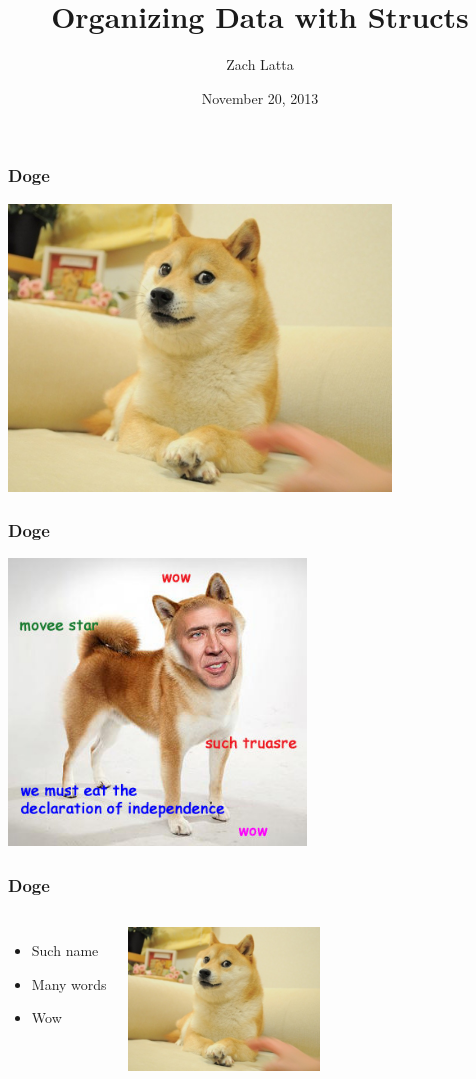 \documentclass{beamer}
\begin{document}
\title[Structs]{Organizing Data with Structs}
\author[Z. Latta]{Zach Latta}
\date[November 2013]{November 20, 2013}

\frame{\titlepage}

\begin{frame}
  \frametitle{Doge}
  \includegraphics[height=3.0in]{doge}
\end{frame}

\begin{frame}
  \frametitle{Doge}
  \includegraphics[height=3.0in]{doge_cage}
\end{frame}

\begin{frame}
  \frametitle{Doge}
  \begin{columns}[c]
    \column{1.5in}
    \begin{itemize}
      \item Such name
      \item Many words
      \item Wow
    \end{itemize}

    \column{1.5in}
    \includegraphics[width=2.0in]{doge}
  \end{columns}
\end{frame}
\end{document}
